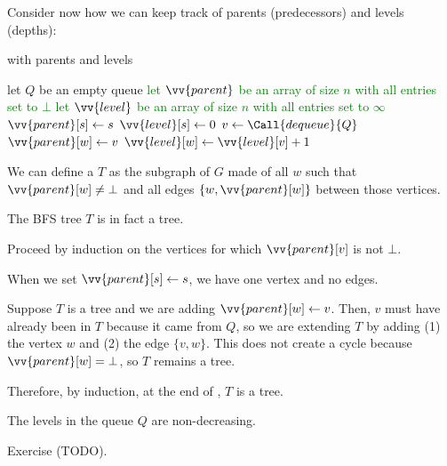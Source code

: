 Consider now how we can keep track of parents (predecessors)
and levels (depths):
\begin{algorithm}[H]
  \caption{ with parents and levels}
  \begin{algorithmic}[1]
    \State let $Q$ be an empty queue
    \State \textcolor{Green}{let $\vv{parent}$ be an array of size $n$ with all entries set to $\bot$}
    \State \textcolor{Green}{let $\vv{level}$ be an array of size $n$ with all entries set to $\infty$}
    \State {}
    \State \textcolor{Green}{$\vv{parent}[s] \gets s$}
    \State \textcolor{Green}{$\vv{level}[s] \gets0$}
    \State $v \gets \Call{dequeue}{Q}$
    \State {}
    \State \textcolor{Green}{$\vv{parent}[w] \gets v$}
    \State \textcolor{Green}{$\vv{level}[w] \gets \vv{level}[v] + 1$}
    \EndIf
    \EndFor
    \EndWhile
  \end{algorithmic}
\end{algorithm}
We can define a  $T$ as the subgraph of $G$
made of all $w$ such that $\vv{parent}[w] \neq \bot$
and all edges $\{w,\vv{parent}[w]\}$ between those vertices.

\begin{claim}
  The BFS tree $T$ is in fact a tree.
\end{claim}
\begin{prf}
  Proceed by induction on the vertices for which $\vv{parent}[v]$ is not $\bot$.

  When we set $\vv{parent}[s] \gets s$, we have one vertex and no edges.

  Suppose $T$ is a tree and we are adding $\vv{parent}[w] \gets v$.
  Then, $v$ must have already been in $T$ because it came from $Q$,
  so we are extending $T$ by adding (1) the vertex $w$ and (2) the edge $\{v,w\}$.
  This does not create a cycle because $\vv{parent}[w] = \bot$,
  so $T$ remains a tree.

  Therefore, by induction, at the end of , $T$ is a tree.
\end{prf}

\begin{claim}\label{claim:bfs:level-non-decreasing}
  The levels in the queue $Q$ are non-decreasing.
\end{claim}
\begin{prf}
  Exercise (TODO).
\end{prf}

